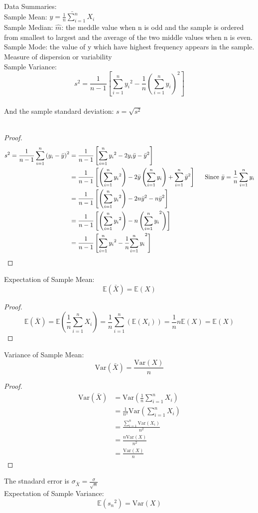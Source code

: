 \documentclass{article}
\newcommand{\E}{\mathbb{E}}
\newcommand{\Var}{\mathrm{Var}}
\newcommand{\sqr}[1]{{#1}^2}
\begin{document}
\noindent Data Summaries:\\
\indent Sample Mean: $\bar{y = \frac{1}{n}\sum_{i=1}^{n}X_i}$\\
\indent Sample Median: $\hat{m}$: the meddle value when n is odd and the sample is ordered from smallest to largest and the average of the two middle values when n is even. \\
\indent Sample Mode: the value of y which have highest frequency appears in the sample. \\
\noindent Measure of dispersion or variability\\
\indent Sample Variance: $$\sqr{s} = \frac{1}{n-1}\left[\sum_{i=1}^{n}\sqr{y_i} - \frac{1}{n}\sqr{\left(\sum_{i=1}^{n}y_i\right)}\right]$$ \\
\indent And the sample standard deviation: $s = \sqrt{\sqr{s}}$\\\\
\begin{proof}
    \begin{align*}
        \sqr{s} = \frac{1}{n-1}\sum_{i=1}^{n}\sqr{\left(y_i - \bar{y}\right)} &= \frac{1}{n-1}\left[\sum_{i=1}^{n}\sqr{y_i} - 2y_i\bar{y} -  \sqr{\bar{y}}\right]\\
            &=\frac{1}{n-1}\left[\left(\sum_{i=1}^{n}\sqr{y_i}\right) - 2\bar{y}\left(\sum_{i=1}^{n}y_i\right) + \sum_{i=1}^{n}\sqr{\bar{y}}\right] \indent \text{Since } \bar{y} = \frac{1}{n}\sum_{i=1}^{n}y_i\\
            &=\frac{1}{n-1}\left[\left(\sum_{i=1}^{n}\sqr{y_i}\right) - 2n\sqr{\bar{y}} - n\sqr{\bar{y}}\right]\\
            &=\frac{1}{n-1}\left[\left(\sum_{i=1}^{n}\sqr{y_i}\right) - n\left(\sqr{\sum_{i=1}^{n}y_i}\right)\right]\\
            &=\frac{1}{n-1}\left[\sum_{i=1}^{n}\sqr{y_i} - \frac{1}{n}\sqr{\sum_{i=1}^{n}y_i}\right]
    \end{align*}
\end{proof}

\noindent Expectation of Sample Mean:
$$\E(\bar{X}) = \E(X)$$

\begin{proof}
    $$\E(\bar{X}) = \E(\frac{1}{n}\sum_{i=1}^{n}X_i) = \frac{1}{n}\sum_{i=1}^{n}\left(\E(X_i)\right) = \frac{1}{n} n \E(X) = \E(X)$$ 
\end{proof}
\noindent Variance of Sample Mean:
$$\Var(\bar{X}) = \frac{\Var(X)}{n}$$
\begin{proof}
    \begin{align*}
        \Var(\bar{X}) &= \Var(\frac{1}{n}\sum_{i=1}^{n}X_i)\\
        &= \frac{1}{\sqr{n}}\Var(\sum_{i=1}^{n}X_i)\\
        &= \frac{\sum_{i=1}^{n}\Var(X_i)}{\sqr{n}}\\
        &= \frac{n\Var(X)}{\sqr{n}}\\
        &= \frac{\Var(X)}{n}
    \end{align*}
\end{proof}
\noindent The stnadard error is $\sigma_{\bar{X}} = \frac{\sigma}{\sqrt{n}}$\\
\noindent Expectation of Sample Variance:
$$\E(\sqr{s_n}) = \Var(X)$$
\end{document}
